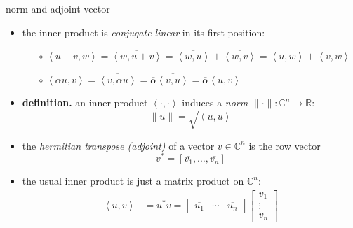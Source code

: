 \documentclass[10pt,hyperref]{beamer}
\newcommand{\CC}{\mathbb{C}}
\newcommand{\RR}{\mathbb{R}}
\newcommand{\ip}[2]{\left<#1,#2\right>}
\begin{document}
\begin{frame}{norm and adjoint vector}

\begin{itemize}
\item the inner product is \emph{conjugate-linear} in its first position:
    \begin{itemize}
    \item[$\circ$] $\ip{u+v}{w} = \overline{\ip{w}{u+v}} = \overline{\ip{w}{u}} + \overline{\ip{w}{v}} = \ip{u}{w} + \ip{v}{w}$
    \item[$\circ$] $\ip{\alpha u}{v} =\overline{\ip{v}{\alpha u}} = \overline{\alpha} \overline{\ip{v}{u}} =\overline{\alpha} \ip{u}{v}$
    \end{itemize}
\item \textbf{definition.}  an inner product $\ip{\cdot}{\cdot}$ induces a \emph{norm} $\|\cdot\|:\CC^n \to \RR$:
    $$\|u\| = \sqrt{\ip{u}{u}}$$
\item the \emph{hermitian transpose (adjoint)} of a vector $v\in\CC^n$ is the row vector
    $$v^* = [\overline{v_1},\dots,\overline{v_n}]$$
\item the usual inner product is just a matrix product on $\CC^n$:
\begin{align*}
\ip{u}{v} &= u^* v = \begin{bmatrix}
    \overline{u_1} & \cdots & \overline{u_n}
    \end{bmatrix} \begin{bmatrix}
    v_1 \\ \vdots \\ v_n
    \end{bmatrix}
\end{align*}
\end{itemize}
\end{frame}
\end{document}
